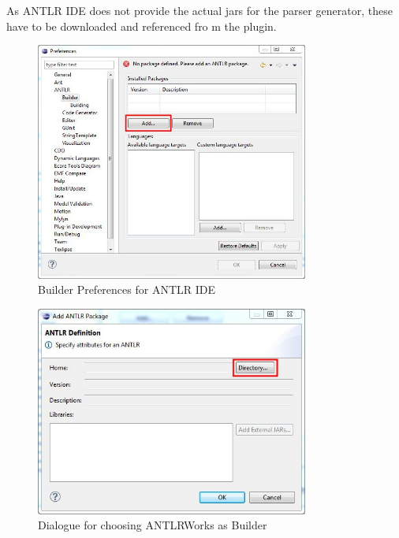 \begin{enumerate}
As ANTLR IDE does not provide the actual jars for the parser generator, these have to be downloaded and referenced fro m the plugin.
\begin{figure}[!htbp]
\begin{center}
 \includegraphics[width=0.8\textwidth]{pics/moca/0Install/1-antlr-package}
  \caption{Builder Preferences for ANTLR IDE}
  \label{moca-1-antlr-package}
\end{center}
\end{figure}
\begin{figure}[!htbp]
\begin{center}
 \includegraphics[width=0.8\textwidth]{pics/moca/0Install/2-choose-path-to-jar}
  \caption{Dialogue for choosing ANTLRWorks as Builder}
  \label{moca-2-choose-path-to-jar}
\end{center}
\end{figure}
\end{enumerate}

\clearpage